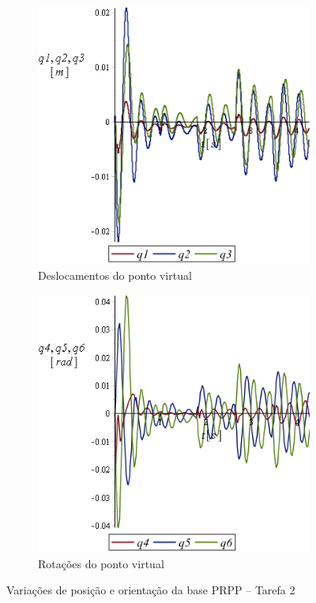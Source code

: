 \begin{figure}[h]
    \centering
    \begin{subfigure}[b]{0.48\textwidth}
        \includegraphics[width=\textwidth]{figs/t2_q123_base_prpp}
        \caption{Deslocamentos do ponto virtual}
        \label{fig::t2_q123_base_prpp}
    \end{subfigure}
    \quad %
    \begin{subfigure}[b]{0.48\textwidth}
        \includegraphics[width=\textwidth]{figs/t2_q456_base_prpp}
        \caption{Rotações do ponto virtual}
        \label{fig::t2_q456_base_prpp}
    \end{subfigure}
    \caption{Variações de posição e orientação da base PRPP -- Tarefa 2}
    \label{fig::t2_q123456_base_prpp}
\end{figure}

